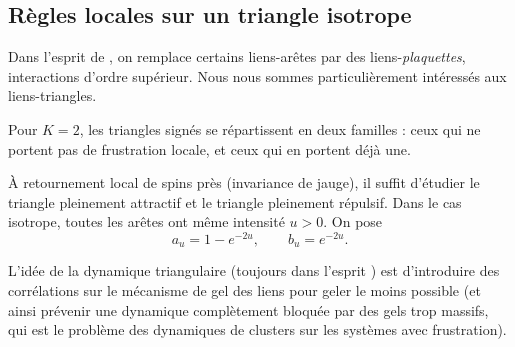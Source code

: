 

\subsection{Règles locales sur un triangle isotrope}

Dans l'esprit de \KBD{} \cite{KBD1992}, on remplace certains liens-arêtes par des liens-\emph{plaquettes}, interactions d'ordre supérieur. 
Nous nous sommes particulièrement intéressés aux liens-triangles.

Pour $K=2$, les triangles signés se répartissent en deux familles : ceux qui ne portent pas de frustration locale, et ceux qui en portent déjà une. 

À retournement local de spins près (invariance de jauge), il suffit d'étudier le triangle pleinement attractif et le triangle pleinement répulsif. 
Dans le cas isotrope, toutes les arêtes ont même intensité $u>0$. On pose
\begin{equation}
    a_u=1-e^{-2u},
    \qquad
    b_u=e^{-2u}.
    \label{eq:chapII_triangle_ab}
\end{equation}

L'idée de la dynamique triangulaire (toujours dans l'esprit \KBD{}) est d'introduire des corrélations sur le mécanisme de gel des liens pour geler le moins possible (et ainsi prévenir une dynamique complètement bloquée par des gels trop massifs, qui est le problème des dynamiques de clusters sur les systèmes avec frustration).

